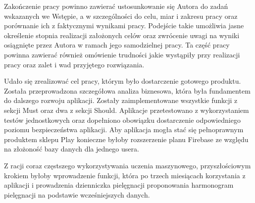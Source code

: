 Zakończenie pracy powinno zawierać ustosunkowanie się Autora do zadań wskazanych we Wstępie, a w szczególności do celu, miar i zakresu pracy oraz porównanie ich z faktycznymi wynikami pracy. Podejście takie umożliwia jasne określenie stopnia realizacji założonych celów oraz zwrócenie uwagi na wyniki osiągnięte przez Autora w ramach jego samodzielnej pracy. Ta część pracy powinna zawierać również omówienie trudności jakie wystąpiły przy realizacji pracy oraz zalet i wad przyjętego rozwiązania.


Udało się zrealizować cel pracy, którym było dostarczenie gotowego produktu. Została przeprowadzona szczegółowa analiza biznesowa, która była fundamentem do dalszego rozwoju aplikacji. Zostały zaimplementowane wszystkie funkcji z sekcji Must oraz dwa z sekcji Should. Aplikacje przetestowano z wykorzystaniem testów jednostkowych oraz dopełniono obowiązku dostarczenie odpowiedniego poziomu bezpieczeństwa aplikacji. Aby aplikacja mogła stać się pełnoprawnym produktem sklepu Play konieczne byłoby rozszerzenie planu Firebase ze względu na złożoność bazy danych dla jednego usera.

Z racji coraz częstszego wykorzystywania uczenia maszynowego, przyszłościowym krokiem byłoby wprowadzenie funkcji, która po trzech miesiącach korzystania z aplikacji i prowadzenia dzienniczka pielęgnacji proponowania harmonogram pielęgnacji na podstawie wcześniejszych danych.
